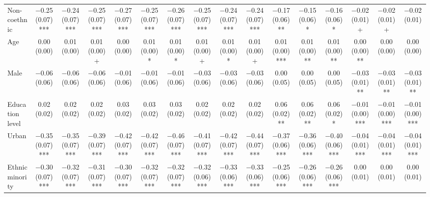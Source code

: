 \begin{table}
\begin{tabular}[t]{lccccccccccccccc}
Non-coethnic & \num{-0.25} (\num{0.07})*** & \num{-0.24} (\num{0.07})*** & \num{-0.25} (\num{0.07})*** & \num{-0.27} (\num{0.07})*** & \num{-0.25} (\num{0.07})*** & \num{-0.26} (\num{0.07})*** & \num{-0.25} (\num{0.07})*** & \num{-0.24} (\num{0.07})*** & \num{-0.24} (\num{0.07})*** & \num{-0.17} (\num{0.06})** & \num{-0.15} (\num{0.06})* & \num{-0.16} (\num{0.06})* & \num{-0.02} (\num{0.01})+ & \num{-0.02} (\num{0.01})+ & \num{-0.02} (\num{0.01})\\
Age & \num{0.00} (\num{0.00}) & \num{0.01} (\num{0.00}) & \num{0.01} (\num{0.00})+ & \num{0.00} (\num{0.00}) & \num{0.01} (\num{0.00})* & \num{0.01} (\num{0.00})* & \num{0.01} (\num{0.00})+ & \num{0.01} (\num{0.00})* & \num{0.01} (\num{0.00})+ & \num{0.01} (\num{0.00})*** & \num{0.01} (\num{0.00})** & \num{0.01} (\num{0.00})** & \num{0.00} (\num{0.00})** & \num{0.00} (\num{0.00}) & \num{0.00} (\num{0.00})\\
Male & \num{-0.06} (\num{0.06}) & \num{-0.06} (\num{0.06}) & \num{-0.06} (\num{0.06}) & \num{-0.01} (\num{0.06}) & \num{-0.01} (\num{0.06}) & \num{-0.01} (\num{0.06}) & \num{-0.03} (\num{0.06}) & \num{-0.03} (\num{0.06}) & \num{-0.03} (\num{0.06}) & \num{0.00} (\num{0.05}) & \num{0.00} (\num{0.05}) & \num{0.00} (\num{0.05}) & \num{-0.03} (\num{0.01})** & \num{-0.03} (\num{0.01})** & \num{-0.03} (\num{0.01})**\\
Education level & \num{0.02} (\num{0.02}) & \num{0.02} (\num{0.02}) & \num{0.02} (\num{0.02}) & \num{0.03} (\num{0.02}) & \num{0.03} (\num{0.02}) & \num{0.03} (\num{0.02}) & \num{0.02} (\num{0.02}) & \num{0.02} (\num{0.02}) & \num{0.02} (\num{0.02}) & \num{0.06} (\num{0.02})** & \num{0.06} (\num{0.02})** & \num{0.06} (\num{0.02})* & \num{-0.01} (\num{0.00})*** & \num{-0.01} (\num{0.00})*** & \num{-0.01} (\num{0.00})***\\
Urban & \num{-0.35} (\num{0.07})*** & \num{-0.35} (\num{0.07})*** & \num{-0.39} (\num{0.07})*** & \num{-0.42} (\num{0.07})*** & \num{-0.42} (\num{0.07})*** & \num{-0.46} (\num{0.07})*** & \num{-0.41} (\num{0.07})*** & \num{-0.42} (\num{0.07})*** & \num{-0.44} (\num{0.07})*** & \num{-0.37} (\num{0.06})*** & \num{-0.36} (\num{0.06})*** & \num{-0.40} (\num{0.06})*** & \num{-0.04} (\num{0.01})*** & \num{-0.04} (\num{0.01})*** & \num{-0.04} (\num{0.01})***\\
Ethnic minority & \num{-0.30} (\num{0.07})*** & \num{-0.32} (\num{0.07})*** & \num{-0.31} (\num{0.07})*** & \num{-0.30} (\num{0.07})*** & \num{-0.32} (\num{0.07})*** & \num{-0.32} (\num{0.07})*** & \num{-0.32} (\num{0.06})*** & \num{-0.33} (\num{0.06})*** & \num{-0.33} (\num{0.06})*** & \num{-0.25} (\num{0.06})*** & \num{-0.26} (\num{0.06})*** & \num{-0.26} (\num{0.06})*** & \num{0.00} (\num{0.01}) & \num{0.00} (\num{0.01}) & \num{0.00} (\num{0.01})\\

\end{tabular}
\end{table}
